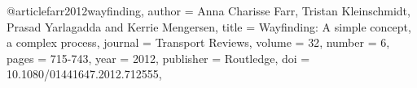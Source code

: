 @article{farr2012wayfinding,
author = {Anna Charisse Farr, Tristan Kleinschmidt, Prasad Yarlagadda and Kerrie Mengersen},
title = {Wayfinding: A simple concept, a complex process},
journal = {Transport Reviews},
volume = {32},
number = {6},
pages = {715-743},
year = {2012},
publisher = {Routledge},
doi = {10.1080/01441647.2012.712555},
}